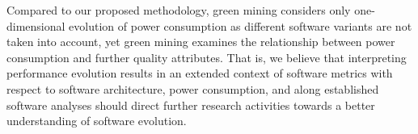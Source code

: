 Compared to our proposed methodology, green mining considers only 
one-dimensional evolution of power consumption as different software variants
are not taken into account, yet green mining examines the relationship between
power consumption and further quality attributes. That is, we believe that
interpreting performance evolution results in an extended context of software
metrics with respect to software architecture, power consumption, and along
established software analyses should direct further research activities towards
a better understanding of software evolution.